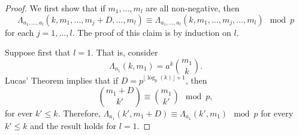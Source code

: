 \begin{proof}
We first show that if $m_1,\ldots, m_l$ are all non-negative, then $$\Lambda_{a_1,\ldots,a_l}(k,m_1,\ldots,m_j+D,\ldots, m_l)\equiv\Lambda_{a_1,\ldots,a_l}(k,m_1,\ldots,m_j,\ldots, m_l)\mod p$$ 
for each $j=1,\ldots, l$.  The proof of this claim is by induction on $l$.  

Suppose first that $l=1$.  That is, consider
 \begin{equation}
  \Lambda_{a_1}(k,m_1) = a^k\binom{m_1}{k}.
 \end{equation}
Lucas' Theorem implies that if $D=p^{\lfloor\log_p(k)\rfloor+1}$, then
\begin{equation}
 \binom{m_1+D}{k'}\equiv \binom{m_1}{k'}\mod p,
\end{equation}
for ever $k'\leq k$.
Therefore, $\Lambda_{a_1}(k',m_1+D)\equiv \Lambda_{a_1}(k',m_1)\mod p$ for every $k'\leq k$ and the result holds for $l=1$.  


\end{proof}
